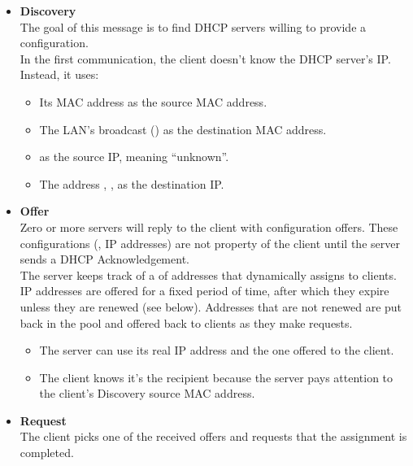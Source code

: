 \begin{itemize}

\item \textbf{Discovery}\\
The goal of this message is to find DHCP servers willing to provide 
a configuration.\\[-0.3cm]

In the first communication, the client 
doesn't know the DHCP server's IP. Instead, it uses:
\begin{itemize}
\item Its MAC address as the source MAC address.
\item The LAN's broadcast () as the destination MAC address.
\item {} as the source IP, meaning ``unknown''.
\item The  address , , as the destination IP.
\end{itemize}

\vspace{0.25cm}
\item \textbf{Offer}\\
Zero or more servers will reply to the client with configuration offers.
These configurations (\eg, IP addresses) are not property of the client 
until the server sends a DHCP Acknowledgement.\\[-0.3cm]

The server keeps track of a  of addresses that dynamically 
assigns to clients.
% 
IP addresses are offered for a fixed period of time, after which they expire
unless they are renewed (see below). Addresses that are not renewed are put
back in the pool and offered back to clients as they make requests.
\\[-0.3cm]

\begin{itemize}
\item The server can use its real IP address and the one offered to the client.
\item The client knows it's the recipient because the server pays attention to the
client's Discovery source MAC address.
\end{itemize}

\vspace{0.25cm}
\item \textbf{Request}\\
The client picks one of the received offers and requests that the 
assignment is completed.\\[-0.3cm]


\end{itemize}
